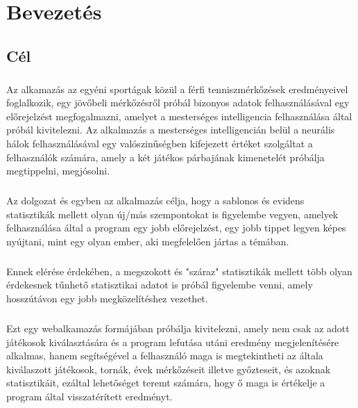 \chapter{Bevezetés}\label{ch:Bevezetés}

\section{Cél}\label{sec:ALAP:adatelem}
\paragraph{}Az alkamazás az egyéni sportágak közül a férfi tenniszmérkőzések eredményeivel foglalkozik, egy jövőbeli mérkőzésről próbál bizonyos adatok felhasználásával egy előrejelzést megfogalmazni, amelyet a mesterséges intelligencia felhasználása által próbál kivitelezni. Az alkalmazás a mesterséges intelligencián belül a neurális hálok felhasználásával egy valószinűségben kifejezett értéket szolgáltat a felhasználók számára, amely a két játékos párbajának kimenetelét próbálja megtippelni, megjósolni. 

\paragraph{}Az dolgozat és egyben az alkalmazás célja, hogy a sablonos és evidens statisztikák mellett  olyan új/más szempontokat is figyelembe vegyen, amelyek felhasználása által a program egy jobb előrejelzést, egy jobb tippet legyen képes nyújtani, mint egy olyan ember, aki megfelelően jártas a témában. 

\paragraph{}Ennek elérése érdekében, a megszokott és "száraz" statisztikák mellett több olyan érdekesnek tűnhető statisztikai adatot is próbál figyelembe venni, amely hosszútávon egy jobb megközelítéshez vezethet.

\paragraph{}Ezt egy webalkamazás formájában próbálja kivitelezni, amely nem csak az adott játékosok kiválasztására és a program lefutása utáni eredmény megjelenítésére alkalmas, hanem segítségével a felhasználó maga is megtekintheti az általa kiválaszott játékosok, tornák, évek mérkőzéseit illetve győzteseit, és azoknak statisztikáit, ezáltal lehetőséget teremt számára, hogy ő maga is értékelje a program által visszatérített eredményt.

